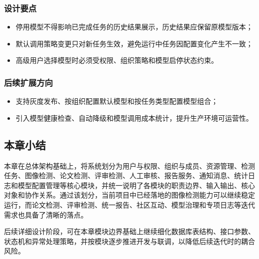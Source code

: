 \subsubsection{设计要点}
\begin{itemize}[leftmargin=2em]
    \item 停用模型不得影响已完成任务的历史结果展示，历史结果应保留原模型版本；
    \item 默认调用策略变更只对新任务生效，避免运行中任务因配置变化产生不一致；
    \item 高级用户选择模型时必须受权限、组织策略和模型启停状态约束。
\end{itemize}

\subsubsection{后续扩展方向}
\begin{itemize}[leftmargin=2em]
    \item 支持灰度发布、按组织配置默认模型和按任务类型配置模型组合；
    \item 引入模型健康检查、自动降级和模型调用成本统计，提升生产环境可运营性。
\end{itemize}

\subsection{本章小结}
本章在总体架构基础上，将系统划分为用户与权限、组织与成员、资源管理、检测任务、图像检测、论文检测、评审检测、人工审核、报告服务、通知消息、统计日志和模型配置管理等核心模块，并统一说明了各模块的职责边界、输入输出、核心对象和协作关系。通过该划分，当前项目中已经落地的图像检测能力可以继续稳定运行，而论文检测、评审检测、统一报告、社区互动、模型治理和专项日志等迭代需求也具备了清晰的落点。

后续详细设计阶段，可在本章模块边界基础上继续细化数据库表结构、接口参数、状态机和异常处理策略，并按模块逐步推进开发与联调，以降低后续迭代时的耦合风险。
